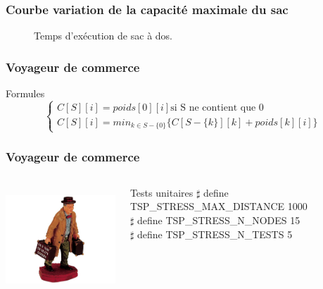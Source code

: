 \documentclass[french]{beamer}
\begin{document}
  \begin{frame}
    \frametitle{Courbe variation de la capacité maximale du sac}
\begin{figure}[h!]
\centering
{}
\caption{Temps d'exécution de sac à dos.}
\end{figure}
  \end{frame}

  \begin{frame}
    \frametitle{Voyageur de commerce}
    \begin{alertblock}{Formules}
      \begin{equation}
        \begin{cases}
          C[S][i] = poids[0][i] \text{si S ne contient que $0$} \\
          C[S][i] = min_{k \in S - \{ 0 \}} \{ C[S- \{ k \}][k] + poids[k][i]  \}
        \end{cases}
      \end{equation}
    \end{alertblock}
  \end{frame}

\begin{frame}
  \frametitle{Voyageur de commerce}
  \begin{columns}
    \begin{column}[]{5cm}
      \begin{center}
        \includegraphics[height=4cm]{salesman2.jpg}
      \end{center}
    \end{column}
      \begin{column}[]{6cm}
        \begin{block}{Tests unitaires}
$\sharp$ define TSP\_STRESS\_MAX\_DISTANCE 1000 \\
$\sharp$ define TSP\_STRESS\_N\_NODES 15  \\
$\sharp$ define TSP\_STRESS\_N\_TESTS 5 \\
        \end{block}
      \end{column}
    \end{columns}
  \end{frame}
\end{document}

